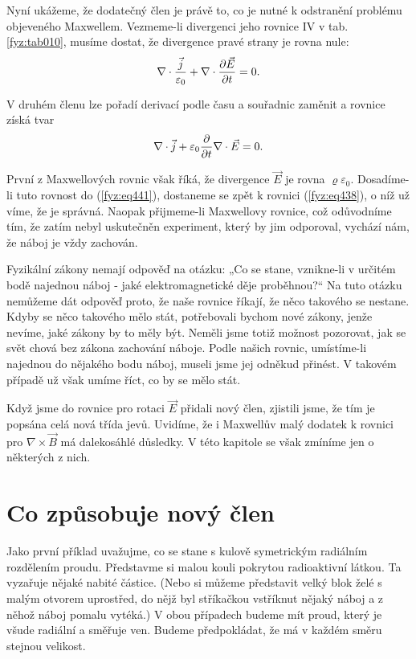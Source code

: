 {  Nyní ukážeme, že dodatečný člen je právě to, co je nutné k odstranění problému objeveného 
  Maxwellem. Vezmeme-li divergenci jeho rovnice IV v tab. \ref{fyz:tab010}, musíme dostat, že 
  divergence pravé strany je rovna nule:
  \begin{equation}\label{fyz:eq440}
    \nabla\cdot\frac{\vec{j}}{\varepsilon_0} + \nabla\cdot\dfrac{\partial \vec{E}}{\partial t} = 0.
  \end{equation}
  
  V druhém členu lze pořadí derivací podle času a souřadnic zaměnit a rovnice získá tvar
  \begin{equation}\label{fyz:eq441}
    \nabla\cdot\vec{j} + \varepsilon_0\dfrac{\partial  }{\partial t}\nabla\cdot\vec{E} = 0.
  \end{equation}
  
  První z Maxwellových rovnic však říká, že divergence \(\vec{E}\) je rovna 
  \(\varrho\varepsilon_0\). Dosadíme-li tuto rovnost do (\ref{fyz:eq441}), dostaneme se zpět k 
  rovnici (\ref{fyz:eq438}), o níž už víme, že je správná. Naopak přijmeme-li Maxwellovy rovnice, 
  což odůvodníme tím, že zatím nebyl uskutečněn experiment, který by jim odporoval, vychází nám, že 
  náboj je vždy zachován. 
  
  Fyzikální zákony nemají odpověď na otázku: „Co se stane, vznikne-li v určitém bodě najednou 
  náboj - jaké elektromagnetické děje proběhnou?“ Na tuto otázku nemůžeme dát odpověď proto, že 
  naše rovnice říkají, že něco takového se nestane. Kdyby se něco takového mělo stát, potřebovali 
  bychom nové zákony, jenže nevíme, jaké zákony by to měly být. Neměli jsme totiž možnost 
  pozorovat, jak se svět chová bez zákona zachování náboje. Podle našich rovnic, umístíme-li 
  najednou do nějakého bodu náboj, museli jsme jej odněkud přinést. V takovém případě už však 
  umíme říct, co by se mělo stát. 
  
  Když jsme do rovnice pro rotaci \(\vec{E}\) přidali nový člen, zjistili jsme, že tím je popsána 
  celá nová třída jevů. Uvidíme, že i Maxwellův malý dodatek k rovnici pro \(\nabla\times\vec{B}\) 
  má dalekosáhlé důsledky. V této kapitole se však zmíníme jen o některých z nich.
  
  
\section{Co způsobuje nový člen}\label{fyz:IIchapXVIIIsecI}
  Jako první příklad uvažujme, co se stane s kulově symetrickým radiálním rozdělením proudu. 
  Představme si malou kouli pokrytou radioaktivní látkou. Ta vyzařuje nějaké nabité částice. (Nebo 
  si můžeme představit velký blok želé s malým otvorem uprostřed, do nějž byl stříkačkou vstříknut 
  nějaký náboj a z něhož náboj pomalu vytéká.) V obou případech budeme mít proud, který je všude 
  radiální a směřuje ven. Budeme předpokládat, že má v každém směru stejnou velikost.
  
}
